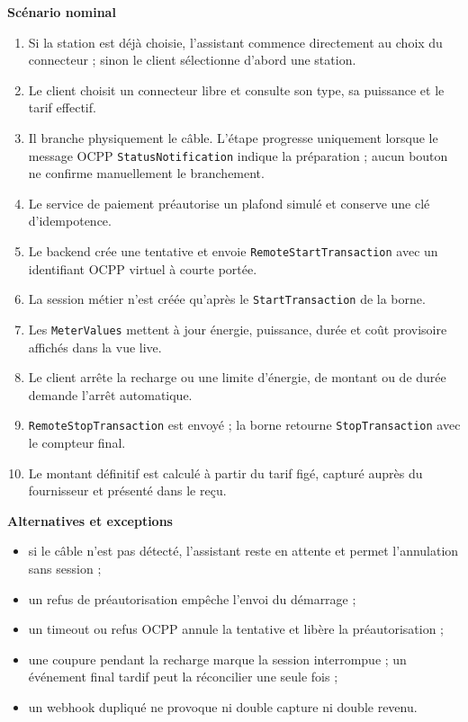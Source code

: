 \textbf{Scénario nominal}
\begin{enumerate}[leftmargin=8mm]
  \item Si la station est déjà choisie, l'assistant commence directement au choix du
  connecteur ; sinon le client sélectionne d'abord une station.
  \item Le client choisit un connecteur libre et consulte son type, sa puissance et le
  tarif effectif.
  \item Il branche physiquement le câble. L'étape progresse uniquement lorsque le
  message OCPP \texttt{Status\-Notification} indique la préparation ; aucun bouton ne confirme
  manuellement le branchement.
  \item Le service de paiement préautorise un plafond simulé et conserve une clé
  d'idempotence.
  \item Le backend crée une tentative et envoie
  \texttt{RemoteStartTransaction} avec un identifiant OCPP virtuel à courte portée.
  \item La session métier n'est créée qu'après le
  \texttt{StartTransaction} de la borne.
  \item Les \texttt{MeterValues} mettent à jour énergie, puissance, durée et coût
  provisoire affichés dans la vue live.
  \item Le client arrête la recharge ou une limite d'énergie, de montant ou de durée
  demande l'arrêt automatique.
  \item \texttt{RemoteStopTransaction} est envoyé ; la borne retourne
  \texttt{StopTransaction} avec le compteur final.
  \item Le montant définitif est calculé à partir du tarif figé, capturé auprès du
  fournisseur et présenté dans le reçu.
\end{enumerate}

\textbf{Alternatives et exceptions}
\begin{itemize}[leftmargin=7mm]
  \item si le câble n'est pas détecté, l'assistant reste en attente et permet
  l'annulation sans session ;
  \item un refus de préautorisation empêche l'envoi du démarrage ;
  \item un timeout ou refus OCPP annule la tentative et libère la préautorisation ;
  \item une coupure pendant la recharge marque la session interrompue ; un événement
  final tardif peut la réconcilier une seule fois ;
  \item un webhook dupliqué ne provoque ni double capture ni double revenu.
\end{itemize}

